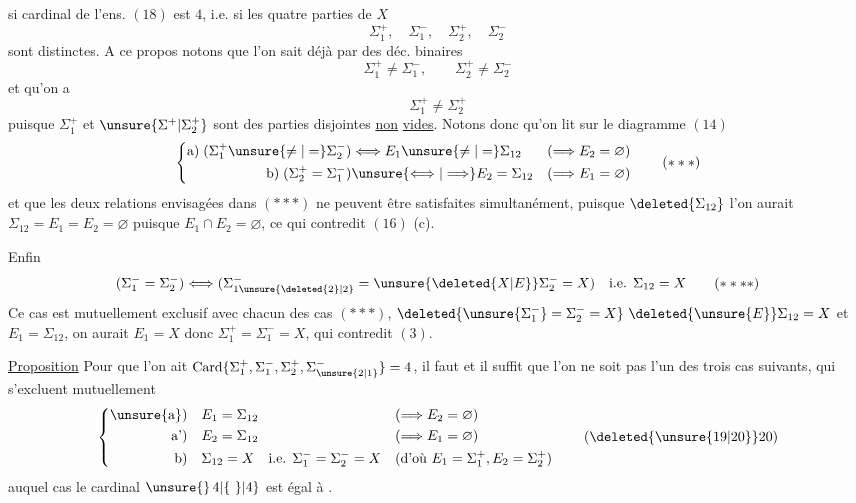\begingroup\makeatletter\tagsleft@true\makeatother
si  cardinal de l'ens. $(18)$ est $4$, i.e. si les quatre parties de $X$
\[
\Sigma_1^+,\quad\Sigma_1^-,\quad\Sigma_2^+,\quad\Sigma_2^-
\]
sont distinctes. A ce propos notons que l'on sait déjà par   des déc. binaires
\[
\Sigma_1^+\ne\Sigma_1^-,\qquad\Sigma_2^+\ne\Sigma_2^-
\tag*{($*$)}
\]
et qu'on a
\[
\Sigma_1^+\ne\Sigma_2^+
\tag*{($**$)}
\]
puisque $\Sigma_1^+$ et $\unsure{\Sigma^+|\Sigma_2^+}$ sont des parties disjointes \uline{non} \uline{vides}. Notons donc qu'on lit sur le diagramme $(14)$
\[
\left\{\begin{aligned}
\text{a)}\;(\Sigma_1^+\unsure{\ne|=}\Sigma_2^-)&\Longleftrightarrow E_1\unsure{\ne|=}\Sigma_{12}
   &(\Longrightarrow E_2=\varnothing)\\
\text{b)}\;(\Sigma_2^+=\Sigma_1^-)&\unsure{\Longleftrightarrow|\Longrightarrow} E_2=\Sigma_{12}
   &(\Longrightarrow E_1=\varnothing)
\end{aligned}\right.
\tag*{($***$)}
\]
et que les deux relations  envisagées dans $(***)$ ne peuvent être satisfaites simultanément, puisque $\deleted{\Sigma_{12}}$ l'on aurait $\Sigma_{12}=E_1=E_2=\varnothing$ puisque $E_1\cap E_2=\varnothing$, ce qui contredit $(16)$ (c).

Enfin
\[
(\Sigma_1^-=\Sigma_2^-)\Longleftrightarrow
(\Sigma_{1\unsure{\deleted{2}|2}}^-=\unsure{\deleted{X|E}}\Sigma_2^-=X)
\quad\text{i.e. }\Sigma_{12}=X
\tag*{($****$)}
\]
Ce cas est mutuellement exclusif avec chacun des cas $(***)$,   $\deleted{\unsure{\Sigma_1^-}=\Sigma_2^-=X}\ \deleted{\unsure{E}}\Sigma_{12}=X$ et $E_1=\Sigma_{12}$, on aurait $E_1=X$ donc $\Sigma_1^+=\Sigma_1^-=X$,  qui contredit $(3)$.

\uline{Proposition} Pour que l'on ait $\operatorname{Card}\{\Sigma_1^+,\Sigma_1^-,\Sigma_2^+,\Sigma_{\unsure{2|1}}^-\}=4$, il faut et il suffit que l'on ne soit pas l'un des trois cas suivants, qui s'excluent mutuellement
\[
\left\{\begin{aligned}
\text{\unsure{a})}\quad &E_1=\Sigma_{12}&&(\Longrightarrow E_2=\varnothing)\\
\text{a')}\quad &E_2=\Sigma_{12}&&(\Longrightarrow E_1=\varnothing)\\
\text{b)}\quad &\Sigma_{12}=X\quad\text{i.e. }\Sigma_1^-=\Sigma_2^-=X
   &&(\text{d'où }E_1=\Sigma_1^+,E_2=\Sigma_2^+)
\end{aligned}\right.
\tag*{(\deleted{\unsure{19|20}}20)}
\]
auquel cas le cardinal  $\unsure{\}\,4|\{\ \}|4}$ est égal à .

\endgroup
\clearpage
